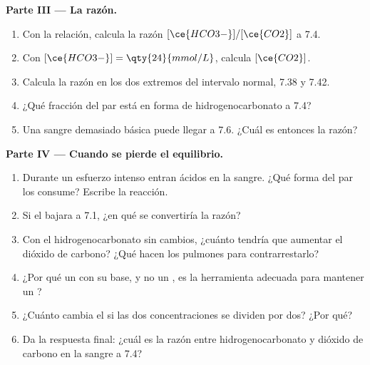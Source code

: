 \begin{problem}
\medskip
\noindent\textbf{Parte III --- La razón.}
\begin{enumerate}[resume]
  \item Con la relación, calcula la razón $[\ce{HCO3-}]/[\ce{CO2}]$ a
         7.4.
  \item Con $[\ce{HCO3-}] = \qty{24}{mmol/L}$, calcula $[\ce{CO2}]$.
  \item Calcula la razón en los dos extremos del intervalo normal, 7.38 y
        7.42.
  \item ¿Qué fracción del par está en forma de hidrogenocarbonato a
         7.4?
  \item Una sangre demasiado básica puede llegar a  7.6. ¿Cuál es
        entonces la razón?
\end{enumerate}

\medskip
\noindent\textbf{Parte IV --- Cuando se pierde el equilibrio.}
\begin{enumerate}[resume]
  \item Durante un esfuerzo intenso entran ácidos en la sangre. ¿Qué
        forma del par los consume? Escribe la reacción.
  \item Si el  bajara a 7.1, ¿en qué se convertiría la razón?
  \item Con el hidrogenocarbonato sin cambios, ¿cuánto tendría que
        aumentar el dióxido de carbono? ¿Qué hacen los pulmones para
        contrarrestarlo?
  \item ¿Por qué un  con su base, y no un , es la
        herramienta adecuada para mantener un ?
  \item ¿Cuánto cambia el  si las dos concentraciones se dividen por
        dos? ¿Por qué?
  \item Da la respuesta final: ¿cuál es la razón entre hidrogenocarbonato
        y dióxido de carbono en la sangre a  7.4?
\end{enumerate}
\end{problem}
